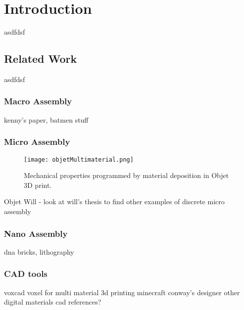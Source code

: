 
\chapter{Introduction}

asdfdsf

\section{Related Work}

asdfdsf

\subsection{Macro Assembly}

kenny's paper, batmen stuff

\subsection{Micro Assembly}

\begin{figure}
  \texttt{[image: objetMultimaterial.png]}
  \caption{Mechanical properties programmed by material deposition in Objet 3D print.}
  \label{fig: objetMultimaterial}
\end{figure}


Objet
Will - look at will's thesis to find other examples of discrete micro assembly

\subsection{Nano Assembly}

dna bricks, lithography

\subsection{CAD tools}

voxcad
voxel for multi material 3d printing
minecraft
conway's designer
other digital materials cad references?

